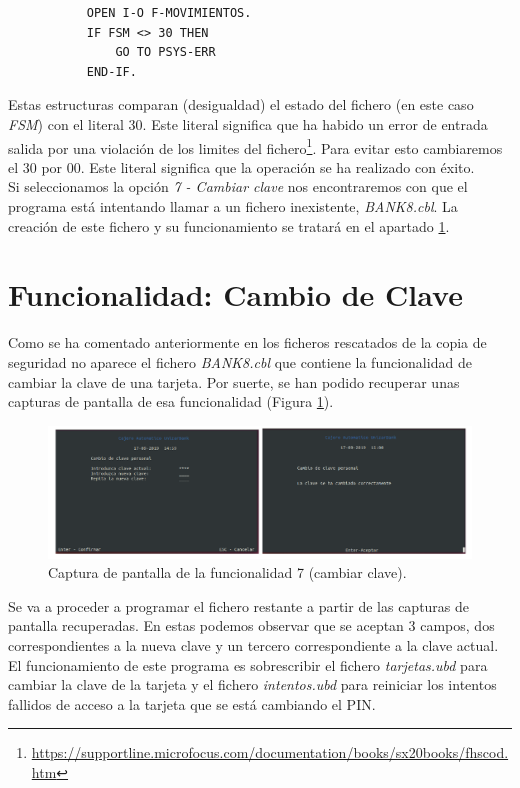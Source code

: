 \documentclass[10pt,a4paper]{article}
\begin{document}
\begin{lstlisting}
           OPEN I-O F-MOVIMIENTOS.
           IF FSM <> 30 THEN
               GO TO PSYS-ERR
           END-IF.
\end{lstlisting}

Estas estructuras comparan (desigualdad) el estado del fichero (en este caso \emph{FSM}) con el literal 30. Este literal significa que ha habido un error de entrada salida por una violación de los limites del fichero\footnote{\url{https://supportline.microfocus.com/documentation/books/sx20books/fhscod.htm}}. Para evitar esto cambiaremos el 30 por 00. Este literal significa que la operación se ha realizado con éxito.\\

Si seleccionamos la opción \emph{7 - Cambiar clave} nos encontraremos con que el programa está intentando llamar a un fichero inexistente, \emph{BANK8.cbl}. La creación de este fichero y su funcionamiento se tratará en el apartado \ref{section:cambio_de_clave}.

\section{Funcionalidad: Cambio de Clave}
\label{section:cambio_de_clave}

Como se ha comentado anteriormente en los ficheros rescatados de la copia de seguridad no aparece el fichero \emph{BANK8.cbl} que contiene la funcionalidad de cambiar la clave de una tarjeta. Por suerte, se han podido recuperar unas capturas de pantalla de esa funcionalidad (Figura \ref{fig:captura_funcion_7}).

\begin{figure}[h!]
\centering
\includegraphics[scale=0.75]{images/funcionalidad7.png}
\caption{Captura de pantalla de la funcionalidad 7 (cambiar clave).}
\label{fig:captura_funcion_7}
\end{figure}

Se va a proceder a programar el fichero restante a partir de las capturas de pantalla recuperadas. En estas podemos observar que se aceptan 3 campos, dos correspondientes a la nueva clave y un tercero correspondiente a la clave actual. \\
El funcionamiento de este programa es sobrescribir el fichero \emph{tarjetas.ubd} para cambiar la clave de la tarjeta y el fichero \emph{intentos.ubd} para reiniciar los intentos fallidos de acceso a la tarjeta que se está cambiando el PIN.
\end{document}
